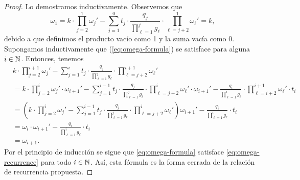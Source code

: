 \begin{proof}
	Lo demostramos inductivamente. Observemos que
	\begin{equation*}
		\omega_1 =
		k \cdot \prod_{j=2}^{1} \omega_j'
		- \sum_{j=1}^{0}
		t_j \cdot
		\frac{q_j}{\prod_{\ell=1}^{j}g_\ell}
		\cdot \prod_{\ell=j+2}^{1}\omega_\ell'
		= k,
	\end{equation*}
	debido a que definimos el producto vacío como 1 y la suma vacía como 0. Supongamos
	inductivamente que (\ref{eq:omega-formula}) se satisface para alguna $i \in \mathbb{N}$. Entonces,
	tenemos
	\begin{align*}
		&k \cdot \prod_{j=2}^{i + 1} \omega_j'
		- \sum_{j=1}^{i}
		t_j \cdot
		\frac{q_j}{\prod_{\ell=1}^{j}g_\ell}
		\cdot \prod_{\ell=j+2}^{i + 1}\omega_\ell' \\
		&=
		k \cdot \prod_{j=2}^{i} \omega_j' \cdot \omega_{i+1}'
		- \sum_{j=1}^{i - 1}
		t_j \cdot
		\frac{q_j}{\prod_{\ell=1}^{j}g_\ell}
		\cdot \prod_{\ell=j+2}^{i}\omega_\ell' \cdot \omega_{i + 1}'
		- \frac{q_i}{\prod_{\ell = 1}^{i}g_\ell}
		\cdot \prod_{\ell = i + 2}^{i + 1}\omega_\ell' \cdot t_i \\
		&= 
		\left( k \cdot \prod_{j=2}^{i} \omega_j'
		- \sum_{j=1}^{i - 1}
		t_j \cdot
		\frac{q_j}{\prod_{\ell=1}^{j}g_\ell}
		\cdot \prod_{\ell=j+2}^{i}\omega_\ell' \right) \omega_{i+1}'
		- \frac{q_i}{\prod_{\ell = 1}^{i}g_\ell} \cdot t_i  \\
		&= \omega_i \cdot \omega_{i + 1}' - \frac{q_i}{\prod_{\ell = 1}^{i}g_\ell} \cdot t_i \\
		&= \omega_{i+1}.
	\end{align*}
	Por el principio de inducción se sigue que \eqref{eq:omega-formula} satisface
	\eqref{eq:omega-recurrence} para todo $i \in \mathbb{N}$. Así, esta fórmula es la forma cerrada de la
	relación de recurrencia propuesta.
\end{proof}

